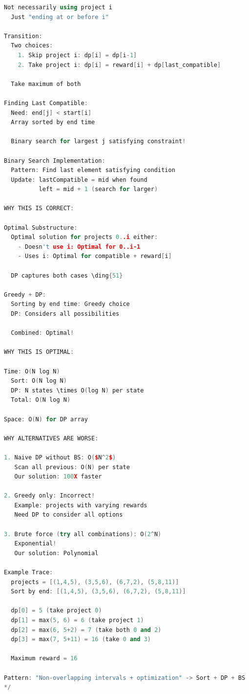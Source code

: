 \documentclass[11pt,a4paper,oneside]{book}
\begin{document}
\begin{lstlisting}[language=C++, caption=Job Scheduling Solutions - NEW PROBLEMS]
  Not necessarily using project i
  Just "ending at or before i"

Transition:
  Two choices:
    1. Skip project i: dp[i] = dp[i-1]
    2. Take project i: dp[i] = reward[i] + dp[last_compatible]
  
  Take maximum of both

Finding Last Compatible:
  Need: end[j] < start[i]
  Array sorted by end time
  
  Binary search for largest j satisfying constraint!

Binary Search Implementation:
  Pattern: Find last element satisfying condition
  Update: lastCompatible = mid when found
          left = mid + 1 (search for larger)

WHY THIS IS CORRECT:

Optimal Substructure:
  Optimal solution for projects 0..i either:
    - Doesn't use i: Optimal for 0..i-1
    - Uses i: Optimal for compatible + reward[i]
  
  DP captures both cases \ding{51}

Greedy + DP:
  Sorting by end time: Greedy choice
  DP: Considers all possibilities
  
  Combined: Optimal!

WHY THIS IS OPTIMAL:

Time: O(N log N)
  Sort: O(N log N)
  DP: N states \times O(log N) per state
  Total: O(N log N)

Space: O(N) for DP array

WHY ALTERNATIVES ARE WORSE:

1. Naive DP without BS: O($N^2$)
   Scan all previous: O(N) per state
   Our solution: 100X faster

2. Greedy only: Incorrect!
   Example: projects with varying rewards
   Need DP to consider all options

3. Brute force (try all combinations): O(2^N)
   Exponential!
   Our solution: Polynomial

Example Trace:
  projects = [(1,4,5), (3,5,6), (6,7,2), (5,8,11)]
  Sort by end: [(1,4,5), (3,5,6), (6,7,2), (5,8,11)]
  
  dp[0] = 5 (take project 0)
  dp[1] = max(5, 6) = 6 (take project 1)
  dp[2] = max(6, 5+2) = 7 (take both 0 and 2)
  dp[3] = max(7, 5+11) = 16 (take 0 and 3)
  
  Maximum reward = 16

Pattern: "Non-overlapping intervals + optimization" -> Sort + DP + BS
*/
\end{lstlisting}
\end{document}

